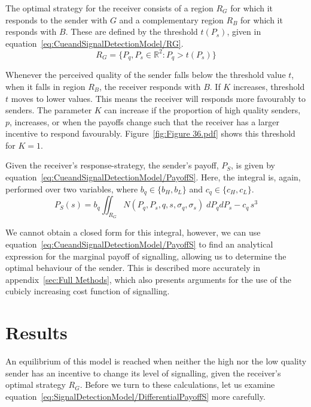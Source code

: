\documentclass[a4paper,12pt]{article}
\numberwithin{equation}{section}
\begin{document}
The optimal strategy for the receiver consists of a region $R_{G}$ for which it responds to the sender with $G$ and a complementary region $R_{B}$ for which it responds with $B$. These are defined by the threshold $t(P_{s})$, given in equation~\ref{eq:CueandSignalDetectionModel/RG}.
\begin{equation}
\label{eq:CueandSignalDetectionModel/RG}
R_{G} = \{P_{q}, P_{s} \in \mathbb{R}^{2} : P_{q}>t(P_{s})\}
\end{equation}

Whenever the perceived quality of the sender falls below the threshold value $t$, when it falls in region $R_{B}$, the receiver responds with $B$. If $K$ increases, threshold $t$ moves to lower values. This means the receiver will responds more favourably to senders. The parameter $K$ can increase if the proportion of high quality senders, $p$, increases, or when the payoffs change such that the receiver has a larger incentive to respond favourably. Figure~\ref{fig:Figure 36.pdf} shows this threshold for $K=1$.

Given the receiver's response-strategy, the sender's payoff, $P_{S}$, is given by equation~\ref{eq:CueandSignalDetectionModel/PayoffS}. Here, the integral is, again, performed over two variables, where $b_{q} \in \{b_{H}, b_{L}\}$ and $c_{q} \in \{c_{H}, c_{L}\}$.
\begin{equation}
\label{eq:CueandSignalDetectionModel/PayoffS}
P_{S}(s) = b_{q} \displaystyle \iint_{R_{G}} N(P_{q}, P_{s}, q, s, \sigma_{q}, \sigma_{s}) \; dP_{q}dP_{s} - c_{q} \, s^{3}
\end{equation}

We cannot obtain a closed form for this integral, however, we can use equation~\ref{eq:CueandSignalDetectionModel/PayoffS} to find an analytical expression for the marginal payoff of signalling, allowing us to determine the optimal behaviour of the sender. This is described more accurately in appendix~\ref{sec:Full Methods}, which also presents arguments for the use of the cubicly increasing cost function of signalling.


\newpage


\section{Results}
\label{sec:Results}

An equilibrium of this model is reached when neither the high nor the low quality sender has an incentive to change its level of signalling, given the receiver's optimal strategy $R_{G}$. Before we turn to these calculations, let us examine equation~\ref{eq:SignalDetectionModel/DifferentialPayoffS} more carefully.
\end{document}
